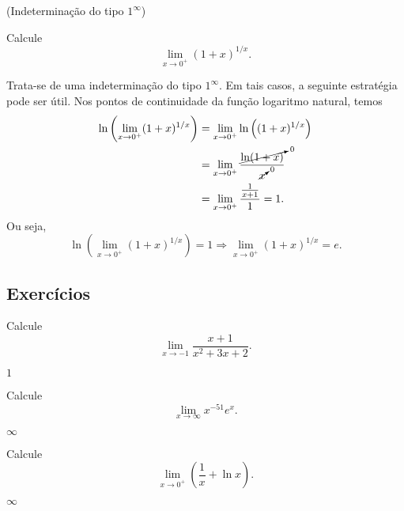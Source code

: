 \begin{exeresol}(Indeterminação do tipo $1^\infty$)

  Calcule
  \begin{equation}
    \lim_{x\to 0^+} (1+x)^{1/x}.
  \end{equation}
\end{exeresol}
\begin{resol}
  Trata-se de uma indeterminação do tipo $1^\infty$. Em tais casos, a seguinte estratégia pode ser útil. Nos pontos de continuidade da função logaritmo natural, temos
  \begin{align}
    \ln\left(\lim_{x\to 0^+} (1+x)^{1/x}\right) &= \lim_{x\to 0^+} \ln\left((1+x)^{1/x}\right) \\
                                                &= \lim_{x\to 0^+} \frac{\cancelto{0}{\ln(1+x)}}{\cancelto{0}{x}} \\
                                                &= \lim_{x\to 0^+} \frac{\frac{1}{x+1}}{1} = 1.
  \end{align}
  Ou seja,
  \begin{equation}
    \ln\left(\lim_{x\to 0^+} (1+x)^{1/x}\right) = 1 \Rightarrow \lim_{x\to 0^+} (1+x)^{1/x} = e.
  \end{equation}
\end{resol}

\subsection{Exercícios}

\begin{exer}
  Calcule
  \begin{equation}
    \lim_{x\to -1} \frac{x+1}{x^2+3x+2}.
  \end{equation}
\end{exer}
\begin{resp}
  $1$
\end{resp}

\begin{exer}
  Calcule
  \begin{equation}
    \lim_{x\to \infty} x^{-51}e^x.
  \end{equation}
\end{exer}
\begin{resp}
  $\infty$
\end{resp}

\begin{exer}
  Calcule
  \begin{equation}
    \lim_{x\to 0^+} \left(\frac{1}{x}+\ln x\right).
  \end{equation}
\end{exer}
\begin{resp}
  $\infty$
\end{resp}


